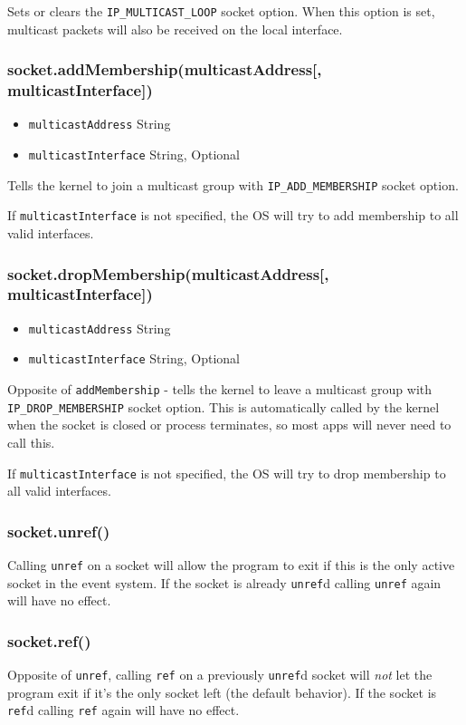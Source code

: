Sets or clears the \texttt{IP\_MULTICAST\_LOOP} socket option. When this
option is set, multicast packets will also be received on the local
interface.

\subsubsection{socket.addMembership(multicastAddress{[},
multicastInterface{]})}\label{socket.addmembershipmulticastaddress-multicastinterface}

\begin{itemize}
\itemsep1pt\parskip0pt
\item
  \texttt{multicastAddress} String
\item
  \texttt{multicastInterface} String, Optional
\end{itemize}

Tells the kernel to join a multicast group with
\texttt{IP\_ADD\_MEMBERSHIP} socket option.

If \texttt{multicastInterface} is not specified, the OS will try to add
membership to all valid interfaces.

\subsubsection{socket.dropMembership(multicastAddress{[},
multicastInterface{]})}\label{socket.dropmembershipmulticastaddress-multicastinterface}

\begin{itemize}
\itemsep1pt\parskip0pt
\item
  \texttt{multicastAddress} String
\item
  \texttt{multicastInterface} String, Optional
\end{itemize}

Opposite of \texttt{addMembership} - tells the kernel to leave a
multicast group with \texttt{IP\_DROP\_MEMBERSHIP} socket option. This
is automatically called by the kernel when the socket is closed or
process terminates, so most apps will never need to call this.

If \texttt{multicastInterface} is not specified, the OS will try to drop
membership to all valid interfaces.

\subsubsection{socket.unref()}\label{socket.unref}

Calling \texttt{unref} on a socket will allow the program to exit if
this is the only active socket in the event system. If the socket is
already \texttt{unref}d calling \texttt{unref} again will have no
effect.

\subsubsection{socket.ref()}\label{socket.ref}

Opposite of \texttt{unref}, calling \texttt{ref} on a previously
\texttt{unref}d socket will \emph{not} let the program exit if it's the
only socket left (the default behavior). If the socket is \texttt{ref}d
calling \texttt{ref} again will have no effect.
